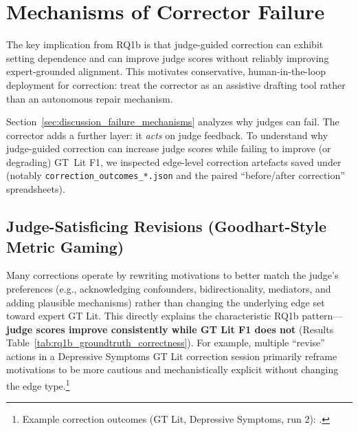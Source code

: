 \section{Mechanisms of Corrector Failure}
\label{sec:discussion_rq1b}
\label{sec:discussion_corrector_failure_mechanisms}

The key implication from RQ1b is that judge-guided correction can exhibit setting dependence and can improve judge scores without reliably improving expert-grounded alignment. This motivates conservative, human-in-the-loop deployment for correction: treat the corrector as an assistive drafting tool rather than an autonomous repair mechanism.

Section~\ref{sec:discussion_failure_mechanisms} analyzes why judges can fail. The corrector adds a further layer: it \emph{acts} on judge feedback. To understand why judge-guided correction can increase judge scores while failing to improve (or degrading) GT~Lit F1, we inspected edge-level correction artefacts saved under \texttt{} (notably \texttt{correction\_outcomes\_*.json} and the paired ``before/after correction'' spreadsheets).

\subsection{Judge-Satisficing Revisions (Goodhart-Style Metric Gaming)}
Many corrections operate by rewriting motivations to better match the judge's preferences (e.g., acknowledging confounders, bidirectionality, mediators, and adding plausible mechanisms) rather than changing the underlying edge set toward expert GT Lit. This directly explains the characteristic RQ1b pattern---\textbf{judge scores improve consistently while GT Lit F1 does not} (Results Table~\ref{tab:rq1b_groundtruth_correctness}). For example, multiple ``revise'' actions in a Depressive Symptoms GT Lit correction session primarily reframe motivations to be more cautious and mechanistically explicit without changing the edge type.\footnote{Example correction outcomes (GT Lit, Depressive Symptoms, run 2): .}


